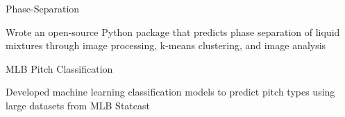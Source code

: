 
\begin{cventries}
  \cventry
    {} %
    {Phase-Separation} %
    {} %
    {} %
    {
      \begin{cvitems} %
        \item {Wrote an open-source Python package that predicts phase separation of liquid
            mixtures through image processing, k-means clustering, and image
              analysis}
      \end{cvitems}
    }

  \cventry
    {} %
    {MLB Pitch Classification} %
    {} %
    {} %
    {
      \begin{cvitems} %
      	\item {Developed machine learning classification models to predict pitch types using
            large datasets from MLB
            Statcast}
      \end{cvitems}
    }

\end{cventries}
